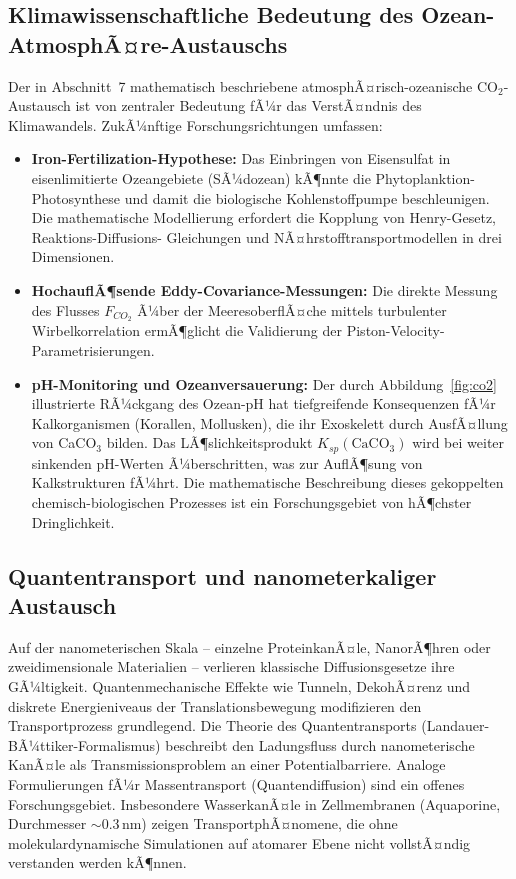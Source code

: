 ﻿\documentclass[a4paper,12pt]{article}
\theoremstyle{definition}
\begin{document}
\subsection{Klimawissenschaftliche Bedeutung des Ozean-AtmosphÃ¤re-Austauschs}

Der in Abschnitt~7 mathematisch beschriebene atmosphÃ¤risch-ozeanische CO$_2$-Austausch
ist von zentraler Bedeutung fÃ¼r das VerstÃ¤ndnis des Klimawandels. ZukÃ¼nftige
Forschungsrichtungen umfassen:
\begin{itemize}
    \item \textbf{Iron-Fertilization-Hypothese:} Das Einbringen von Eisensulfat in
          eisenlimitierte Ozeangebiete (SÃ¼dozean) kÃ¶nnte die Phytoplanktion-Photosynthese
          und damit die biologische Kohlenstoffpumpe beschleunigen. Die mathematische
          Modellierung erfordert die Kopplung von Henry-Gesetz, Reaktions-Diffusions-
          Gleichungen und NÃ¤hrstofftransportmodellen in drei Dimensionen.
    \item \textbf{HochauflÃ¶sende Eddy-Covariance-Messungen:} Die direkte Messung des
          Flusses $F_{CO_2}$ Ã¼ber der MeeresoberflÃ¤che mittels turbulenter Wirbelkorrelation
          ermÃ¶glicht die Validierung der Piston-Velocity-Parametrisierungen.
    \item \textbf{pH-Monitoring und Ozeanversauerung:} Der durch Abbildung~\ref{fig:co2}
          illustrierte RÃ¼ckgang des Ozean-pH hat tiefgreifende Konsequenzen fÃ¼r
          Kalkorganismen (Korallen, Mollusken), die ihr Exoskelett durch AusfÃ¤llung
          von CaCO$_3$ bilden. Das LÃ¶slichkeitsprodukt $K_{sp}(\mathrm{CaCO_3})$
          wird bei weiter sinkenden pH-Werten Ã¼berschritten, was zur AuflÃ¶sung von
          Kalkstrukturen fÃ¼hrt. Die mathematische Beschreibung dieses gekoppelten
          chemisch-biologischen Prozesses ist ein Forschungsgebiet von hÃ¶chster
          Dringlichkeit.
\end{itemize}

\subsection{Quantentransport und nanometerkaliger Austausch}

Auf der nanometerischen Skala -- einzelne ProteinkanÃ¤le, NanorÃ¶hren oder
zweidimensionale Materialien -- verlieren klassische Diffusionsgesetze ihre
GÃ¼ltigkeit. Quantenmechanische Effekte wie Tunneln, DekohÃ¤renz und diskrete
Energieniveaus der Translationsbewegung modifizieren den Transportprozess
grundlegend. Die Theorie des Quantentransports (Landauer-BÃ¼ttiker-Formalismus)
beschreibt den Ladungsfluss durch nanometerische KanÃ¤le als Transmissionsproblem
an einer Potentialbarriere. Analoge Formulierungen fÃ¼r Massentransport (Quantendiffusion)
sind ein offenes Forschungsgebiet. Insbesondere WasserkanÃ¤le in Zellmembranen
(Aquaporine, Durchmesser $\sim 0.3$\,nm) zeigen TransportphÃ¤nomene, die ohne
molekulardynamische Simulationen auf atomarer Ebene nicht vollstÃ¤ndig verstanden
werden kÃ¶nnen.
\end{document}
